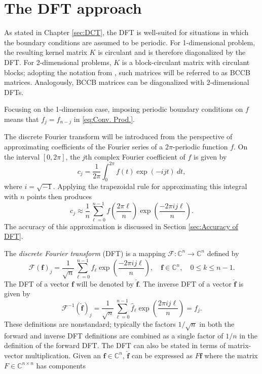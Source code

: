 \documentclass[12pt]{book}
\newcommand{\kMat}{K}	%
\begin{document}
\chapter{The DFT approach} \label{sec:DFT}
As stated in Chapter \ref{sec:DCT}, the DFT is well-suited for situations in which the boundary conditions are assumed to be periodic. For 1-dimensional problem, the resulting kernel matrix $\kMat$ is circulant and is therefore diagonalized by the DFT. For 2-dimensional problems, $\kMat$ is a block-circulant matrix with circulant blocks; adopting the notation from \cite{Vogel:2002}, such matrices will be referred to as BCCB matrices. Analogously, BCCB matrices can be diagonalized with 2-dimensional DFTs. \par 
Focusing on the 1-dimension case, imposing periodic boundary conditions on $f$ means that $f_j = f_{n-j}$ in \eqref{eq:Conv. Prod.}. \par 
The discrete Fourier transform will be introduced from the perspective of approximating coefficients of the Fourier series of a $2\pi$-periodic function $f$. On the interval $[0,2\pi]$, the $j$th complex Fourier coefficient of $f$ is given by
\[c_j = \frac{1}{2\pi}\int_0^{2\pi} f(t)\exp(-ijt)\:dt,\]
where $i = \sqrt{-1}$.  Applying the trapezoidal rule for approximating this integral with $n$ points then produces
\[c_j \approx \frac{1}{n}\sum_{\ell = 0}^{n-1} f\left(\frac{2\pi{\ell}}{n}\right)\exp\left(\frac{-2\pi{ij\ell}}{n}\right).\]
The accuracy of this approximation is discussed in Section \ref{sec:Accuracy of DFT}. \par 
The \textit{discrete Fourier transform} (DFT) is a mapping $\mathcal{F}:\mathbb{C}^n \rightarrow \mathbb{C}^n$ defined by
\begin{equation}
\mathcal{F}(\mathbf{f})_j = \frac{1}{\sqrt{n}}\sum_{\ell=0}^{n-1} f_{\ell}\exp\left(\frac{-2\pi{ij\ell}}{n}\right), \quad \mathbf{f}\in\mathbb{C}^n, \quad 0 \leq k \leq n-1.
\label{eq:DFT}
\end{equation}
The DFT of a vector $\mathbf{f}$ will be denoted by $\widehat{\mathbf{f}}$. The inverse DFT of a vector $\widehat{\mathbf{f}}$ is given by
\begin{equation}
\mathcal{F}^{-1}(\widehat{\mathbf{f}})_j = \frac{1}{\sqrt{n}}\sum_{\ell=0}^{n-1} \widehat{f}_\ell\exp\left(\frac{2\pi{ij\ell}}{n}\right) = f_j.
\end{equation}
These definitions are nonstandard; typically the factors $1/\sqrt{n}$ in both the forward and inverse DFT definitions are combined as a single factor of $1/n$ in the definition of the forward DFT. The DFT can also be stated in terms of matrix-vector multiplication. Given an $\mathbf{f} \in \mathbb{C}^n$, $\widehat{\mathbf{f}}$ can be expressed as $F\mathbf{f}$ where the matrix $F\in\mathbb{C}^{n\times{n}}$ has components
\end{document}
